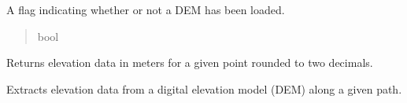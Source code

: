 \documentclass[letterpaper,10pt,english]{sphinxmanual}
\begin{document}
\begin{fulllineitems}
\begin{fulllineitems}
\label{\detokenize{pysewer:pysewer.preprocessing.DEM.no_dem}}
\pysigstartsignatures
{}
\pysigstopsignatures
\sphinxAtStartPar
A flag indicating whether or not a DEM has been loaded.
\begin{quote}\begin{description}
\sphinxAtStartPar
bool

\end{description}\end{quote}

\end{fulllineitems}


\begin{fulllineitems}
\label{\detokenize{pysewer:pysewer.preprocessing.DEM.get_elevation}}
\pysigstartsignatures
{}
\pysigstopsignatures
\sphinxAtStartPar
Returns elevation data in meters for a given point rounded to two decimals.

\end{fulllineitems}


\begin{fulllineitems}
\label{\detokenize{pysewer:pysewer.preprocessing.DEM.get_profile}}
\pysigstartsignatures
{}
\pysigstopsignatures
\sphinxAtStartPar
Extracts elevation data from a digital elevation model (DEM) along a given path.

\end{fulllineitems}



\end{fulllineitems}
\end{document}
